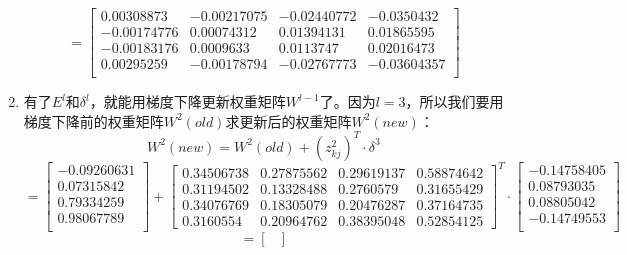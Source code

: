 \documentclass[a4paper,12pt,oneside]{book}
\begin{document}
\begin{enumerate}
    \begin{equation*}
        =\begin{bmatrix}
            0.00308873 & -0.00217075 & -0.02440772 & -0.0350432\\
            -0.00174776 & 0.00074312 & 0.01394131 & 0.01865595\\
            -0.00183176 & 0.0009633 & 0.0113747 & 0.02016473\\
            0.00295259 & -0.00178794 & -0.02767773 & -0.03604357\\
        \end{bmatrix}
    \end{equation*}

    \item 有了$E^{l}$和$\delta^{l}$，就能用梯度下降更新权重矩阵$W^{l-1}$了。因为$l = 3$，所以我们要用梯度下降前的权重矩阵$W^2(old)$求更新后的权重矩阵$W^2(new)$：
    \begin{equation*}
        W^2(new) = W^2(old) + (z^{2}_{kj})^T \cdot \delta^3
    \end{equation*}
    \begin{equation*}
        = \begin{bmatrix}
            -0.09260631\\
            0.07315842\\
            0.79334259\\
            0.98067789\\
        \end{bmatrix} + 
        \begin{bmatrix}
            0.34506738 & 0.27875562 & 0.29619137 & 0.58874642\\
            0.31194502 & 0.13328488 & 0.2760579 & 0.31655429\\
            0.34076769 & 0.18305079 & 0.20476287 & 0.37164735\\
            0.3160554  & 0.20964762 & 0.38395048 & 0.52854125
        \end{bmatrix}^T \cdot
        \begin{bmatrix}
            -0.14758405\\
            0.08793035\\
            0.08805042\\
            -0.14749553\\
        \end{bmatrix}
    \end{equation*}
    \begin{equation*}
        = \begin{bmatrix}

\end{bmatrix}
\end{equation*}
\end{enumerate}
\end{document}
